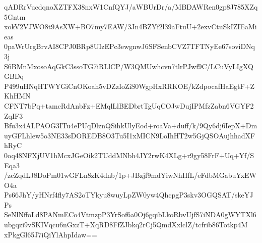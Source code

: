 qADRrVucdqnoXZTFX38nxW1CnfQYJ/aWBUrDr/a/MBDAWRen0gp8J785XZq5Gntm
xokV2VJWO8t9AsXW+BO7my7EAW/3Jn4BZYf2l39aFtuU+2exvCtuSkIZIEaMieas
0paWrUrgBrvAI8CPJ0BRp8UIzEPc3ewgnwJ6SFSenbCVZ7TFTNyEe67soviDNq3j
S6BMnMxosoAqGkC3ssoTG7iRLlCP/W3QMUwhcvn7tlrPJwf9C/LCuVyLIgXQGBDq
P499uHNqHTWYGiCnOKoah5vDZzIoZiS0WgpHxRRKOE/kZdpocafHaEgtF+ZKhHMN
CFNT7bPq+tamcRdAnbFz+EMqlLlBEDbrtTgUqCOJwDujIPMfzZabn6VGYF2ZqIF3
Bfu3x4ALPAOG3ITu4ePUqDlznQSihkUlyEod+roaVa+duff/k/9Qy6dj6IepX+Dm
uyGFLhlew5o3NE33sDOREDB8O3Tu5I1xMICN9LoIhHT2w5GjQSOAujhhadXFhRyC
0oq48NFXjUV1hMcxJGeOik2TUddMNbh4JY2rwK4XLg+r9gy58FrF+Uq+Yf/SEqa3
/zcZqdLJ8DoPm01wGFLn8zK4dnb/1p+JBzjf9mdYiwNhHfL/eFdbMGabuYxEWO4a
Ps66JhY/yHNrf4fly7AS2oTYkyu8wuyLpZW0yw4QhcpgP3skv3OGQSAT/skeYJPs
SeNlNffoLd8PANmECo4VtmzpP3YrSof6a0Oj6gqibLkoRbvUjfS7iNDA0gWYTXl6
ubgqzi9vSKIVqcu6nGxzT+XqRD8FfZJbkq2rCj5QmdXxlclZ/tcfrib86Totkp4M
xPkgGl65J7iQiYlAhpIdaw==
